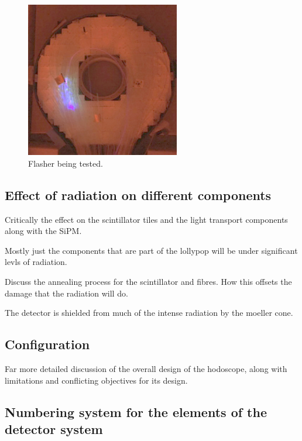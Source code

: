 \begin{figure}
	\centering
	\includegraphics[width=0.6\textwidth]{ImgChap1/flasher}
	\caption{Flasher being tested.}
	\label{flasher}
\end{figure}


\subsection{Effect of radiation on different components}
Critically the effect on the scintillator tiles and the light transport components along with the SiPM. 

Mostly just the components that are part of the lollypop will be under significant levls of radiation.

Discuss the annealing process for the scintillator and fibres. How this offsets the damage that the radiation will do.

The detector is shielded from much of the intense radiation by the moeller cone. 

\cite{bross1990radiation}
\cite{barsuk2000radiation}
\cite{protopopov1993radiation}

\subsection{Configuration}
Far more detailed discussion of the overall design of the hodoscope, along with limitations and conflicting objectives for its design.

\subsection{Numbering system for the elements of the detector system} %

